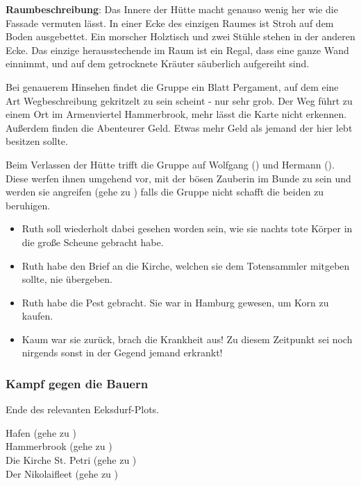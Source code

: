 \textbf{Raumbeschreibung}: Das Innere der Hütte macht genauso wenig her wie die Fassade vermuten lässt. In einer Ecke des einzigen Raumes ist Stroh auf dem Boden ausgebettet. Ein morscher Holztisch und zwei Stühle stehen in der anderen Ecke. Das einzige herausstechende im Raum ist ein Regal, dass eine ganze Wand einnimmt, und auf dem getrocknete Kräuter säuberlich aufgereiht sind.

Bei genauerem Hinsehen findet die Gruppe ein Blatt Pergament, auf dem eine Art Wegbeschreibung gekritzelt zu sein scheint - nur sehr grob. Der Weg führt zu einem Ort im Armenviertel Hammerbrook, mehr lässt die Karte nicht erkennen. Außerdem finden die Abenteurer Geld. Etwas mehr Geld als jemand der hier lebt besitzen sollte.

Beim Verlassen der Hütte trifft die Gruppe auf Wolfgang (\blue{\ref{Wolfgang}}) und Hermann (\blue{\ref{Hermann}}). Diese werfen ihnen umgehend vor, mit der bösen Zauberin im Bunde zu sein und werden sie angreifen (gehe zu \blue{\ref{kampf}}) falls die Gruppe nicht schafft die beiden zu beruhigen.


\begin{itemize}
  \item Ruth soll wiederholt dabei gesehen worden sein, wie sie nachts tote Körper in die große Scheune gebracht habe.
  \item Ruth habe den Brief an die Kirche, welchen sie dem Totensammler mitgeben sollte, nie übergeben.
  \item Ruth habe die Pest gebracht. Sie war in Hamburg gewesen, um Korn zu kaufen.
  \item Kaum war sie zurück, brach die Krankheit aus! Zu diesem Zeitpunkt sei noch nirgends sonst in der Gegend jemand erkrankt!
\end{itemize}

\subsubsection{Kampf gegen die Bauern}
\label{kampf}

\begin{center}
  
\end{center}




Ende des relevanten Eeksdurf-Plots.

Hafen (gehe zu \blue{\ref{Hafen}}) \\
Hammerbrook (gehe zu \blue{\ref{Hammerbrook}}) \\
Die Kirche St. Petri (gehe zu \blue{\ref{Petri}}) \\
Der Nikolaifleet (gehe zu \blue{\ref{Fleet}}) \\
